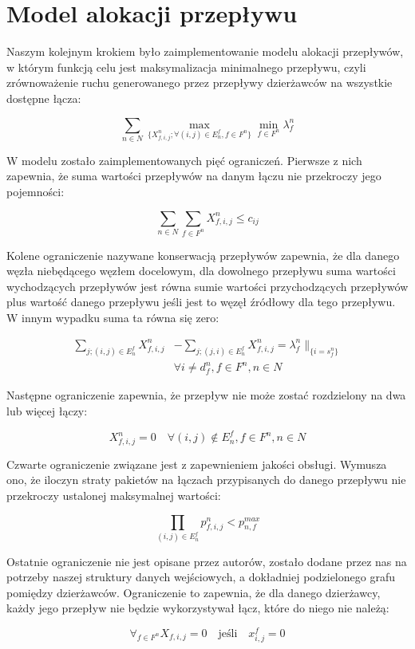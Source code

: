 \section{Model alokacji przepływu}

Naszym kolejnym krokiem było zaimplementowanie modelu alokacji przepływów, w
którym funkcją celu jest maksymalizacja minimalnego przepływu, czyli zrównoważenie
ruchu generowanego przez przepływy dzierżawców na wszystkie dostępne łącza:

\begin{equation}
  \sum_{n \in N} \max_{\{X_{f,i,j}^n;\forall{(i,j)} \in E_n^f,f \in F^n\}} \min_{f \in F^n}\lambda_f^n
\end{equation}

W modelu zostało zaimplementowanych pięć ograniczeń. Pierwsze z nich zapewnia,
że suma wartości przepływów na danym łączu nie przekroczy jego pojemności:

\begin{equation}
  \sum_{n \in N} \sum_{f \in F^n} X_{f,i,j}^n \le c_{ij}
\end{equation}

Kolene ograniczenie nazywane konserwacją przepływów zapewnia, że dla danego węzła
niebędącego węzłem docelowym, dla dowolnego przepływu suma wartości wychodzących
przepływów jest równa sumie wartości przychodzących przepływów plus wartość danego
przepływu jeśli jest to węzęł źródłowy dla tego przepływu. W innym wypadku suma ta
równa się zero:

\begin{equation}
\begin{align*}
  \sum_{j;(i,j) \in E_n^f} X_{f,i,j}^n &- \sum_{j;(j,i) \in E_n^f} X_{f,i,j}^n = \lambda_f^n \parallel_{\{i=s_f^n\}} \\
  & \forall{i} \ne d_f^n, f \in F^n, n \in N
\end{align*}
\end{equation}

Następne ograniczenie zapewnia, że przepływ nie może zostać rozdzielony na
dwa lub więcej łączy:

\begin{equation}
  X_{f,i,j}^n = 0 \quad \forall(i,j) \notin E_n^f, f \in F^n, n \in N
\end{equation}

Czwarte ograniczenie związane jest z zapewnieniem jakości obsługi. Wymusza ono, że
iloczyn straty pakietów na łączach przypisanych do danego przepływu nie przekroczy
ustalonej maksymalnej wartości:

\begin{equation}
  \prod_{(i,j) \in E_n^f} p_{f,i,j}^n < p_{n,f}^{max}
\end{equation}

Ostatnie ograniczenie nie jest opisane przez autorów, zostało dodane przez nas
na potrzeby naszej struktury danych wejściowych, a dokładniej podzielonego grafu pomiędzy
dzierżawców. Ograniczenie to zapewnia, że dla danego dzierżawcy, każdy jego przepływ
nie będzie wykorzystywał łącz, które do niego nie należą:

\begin{equation}
  \forall_{f \in F^n} X_{f,i,j} = 0 \quad \text{jeśli}\quad x_{i,j}^f = 0
\end{equation}
